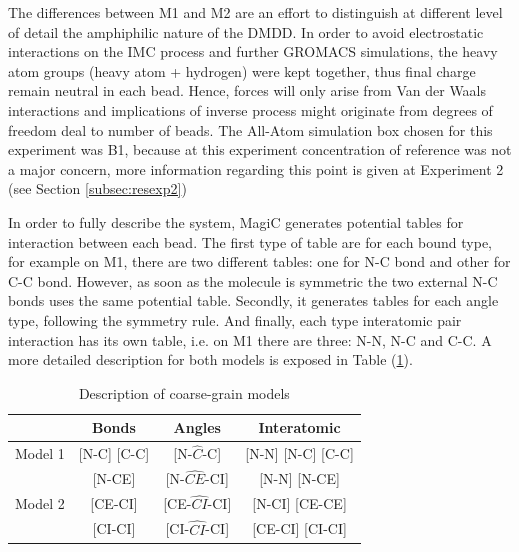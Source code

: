\documentclass[10pt,a4paper,twoside]{article}
\begin{document}
 The differences between M1 and M2 are an effort to distinguish at different level of detail the amphiphilic nature of the DMDD. In order to avoid electrostatic interactions on the IMC process and further GROMACS simulations, the heavy atom groups (heavy atom + hydrogen) were kept together, thus  final charge remain neutral in each bead. Hence, forces will only arise from Van der Waals interactions and implications of inverse process might originate from  degrees of freedom deal to number of beads. The All-Atom simulation box chosen for this experiment was B1, because at this experiment concentration of reference was not a major concern, more information regarding this point is given at Experiment 2 (see Section \ref{subsec:resexp2})
   
 In order to fully describe the system, MagiC generates potential tables for interaction between each bead. The first type of table are for each bound type, for example on M1, there are two different tables: one for N-C bond and other for C-C bond. However, as soon as the molecule is symmetric the two external N-C bonds uses the same potential table. Secondly, it generates tables for each angle type, following the symmetry rule. And finally, each type interatomic pair interaction has its own table, i.e. on M1 there are three: N-N, N-C and C-C. A more detailed description for both models is exposed in Table (\ref{tab:potdes}).
  
 \begin{table}[ht!] 
  \centering
\begin{threeparttable}

  \caption{Description of coarse-grain models}

    \begin{tabular}{c|c|c|c}
    \toprule
    &  Bonds & Angles & Interatomic \\
    \midrule
    Model 1   & [N-C] [C-C]  & [N-$\widehat{C}$-C]  & [N-N] [N-C] [C-C]  \\
    \midrule
      			& [N-CE]  & [N-$\widehat{CE}$-CI]  & [N-N] [N-CE]   \\
      Model 2	& [CE-CI] &  [CE-$\widehat{CI}$-CI] &  [N-CI] [CE-CE]   \\
     			 & [CI-CI]  &  [CI-$\widehat{CI}$-CI] &  [CE-CI] [CI-CI]  \\
    \bottomrule
    \end{tabular}%
  \label{tab:potdes}%
\end{threeparttable} 
\end{table}
\end{document}
